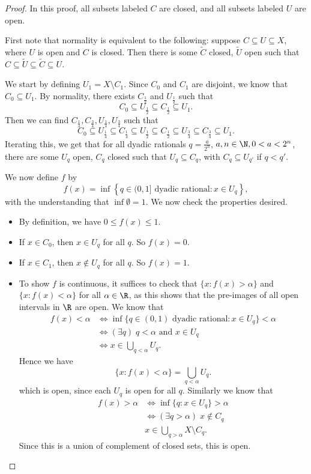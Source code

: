 \documentclass[a4paper]{article}
\begin{document}
\begin{proof}
  In this proof, all subsets labeled $C$ are closed, and all subsets labeled $U$ are open.

  First note that normality is equivalent to the following: suppose $C \subseteq U \subseteq X$, where $U$ is open and $C$ is closed. Then there is some $\tilde{C}$ closed, $\tilde{U}$ open such that $C\subseteq \tilde{U} \subseteq \tilde{C} \subseteq U$.

  We start by defining $U_1 = X \setminus C_1$. Since $C_0$ and $C_1$ are disjoint, we know that $C_0 \subseteq U_1$. By normality, there exists $C_{\frac{1}{2}}$ and $U_{\frac{1}{2}}$ such that
  \[
    C_0 \subseteq U_{\frac{1}{2}} \subseteq C_{\frac{1}{2}} \subseteq U_1.
  \]
  Then we can find $C_{\frac{1}{4}}, C_{\frac{3}{4}}, U_{\frac{1}{4}}, U_{\frac{3}{4}}$ such that
  \[
    C_0 \subseteq U_{\frac{1}{4}}\subseteq C_{\frac{1}{4}} \subseteq U_{\frac{1}{2}} \subseteq C_{\frac{1}{2}} \subseteq U_{\frac{3}{4}} \subseteq C_{\frac{3}{4}} \subseteq U_1.
  \]
  Iterating this, we get that for all dyadic rationals $q = \frac{a}{2^n}$, $a, n\in \N, 0 < a < 2^n$, there are some $U_q$ open, $C_q$ closed such that $U_q \subseteq C_q$, with $C_q \subseteq U_{q'}$ if $q < q'$.

  We now define $f$ by
  \[
  f(x) = \inf\left\{q \in (0, 1] \text{ dyadic rational}: x \in U_q\right\},
\]
with the understanding that $\inf \emptyset = 1$. We now check the properties desired.
\begin{itemize}
  \item By definition, we have $0 \leq f(x) \leq 1$.
  \item If $x \in C_0$, then $x \in U_q$ for all $q$. So $f(x) = 0$.
  \item If $x \in C_1$, then $x \not\in U_q$ for all $q$. So $f(x) = 1$.
  \item To show $f$ is continuous, it suffices to check that $\{x: f(x) > \alpha\}$ and $\{x: f(x) < \alpha\}$ for all $\alpha \in \R$, as this shows that the pre-images of all open intervals in $\R$ are open. We know that
    \begin{align*}
      f(x) < \alpha &\Leftrightarrow \inf\{q \in (0, 1)\text{ dyadic rational}: x \in U_q\} < \alpha \\
      &\Leftrightarrow (\exists q)\; q < \alpha \text{ and }x \in U_q\\
      &\Leftrightarrow x \in \bigcup_{q < \alpha} U_q.
    \end{align*}
    Hence we have
    \[
      \{x: f(x) < \alpha\} = \bigcup_{q < \alpha} U_q.
    \]
    which is open, since each $U_q$ is open for all $q$. Similarly we know that
    \begin{align*}
      f(x) > \alpha &\Leftrightarrow \inf\{q: x \in U_q\} > \alpha\\
      &\Leftrightarrow (\exists q > \alpha)\; x \not\in C_q\\
      & x \in \bigcup_{q > \alpha} X \setminus C_q.
    \end{align*}
    Since this is a union of complement of closed sets, this is open.
\end{itemize}
\end{proof}
\end{document}
